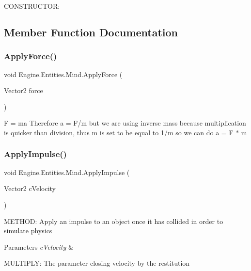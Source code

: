 C\+O\+N\+S\+T\+R\+U\+C\+T\+OR\+: 



\subsection{Member Function Documentation}
\mbox{\label{a00318_a4a05ceb8a5b1eb7f04e3111dd165b4b5}} 
\subsubsection{\texorpdfstring{Apply\+Force()}{ApplyForce()}}
{\footnotesize\ttfamily void Engine.\+Entities.\+Mind.\+Apply\+Force (\begin{DoxyParamCaption}\item[{Vector2}]{force }\end{DoxyParamCaption})\hspace{0.3cm}{\ttfamily [inline]}}

F = ma Therefore a = F/m but we are using inverse mass because multiplication is quicker than division, thus m is set to be equal to 1/m so we can do a = F $\ast$ m \mbox{\label{a00318_a378218df0a8c27a981e98167197d9c16}} 
\subsubsection{\texorpdfstring{Apply\+Impulse()}{ApplyImpulse()}}
{\footnotesize\ttfamily void Engine.\+Entities.\+Mind.\+Apply\+Impulse (\begin{DoxyParamCaption}\item[{Vector2}]{c\+Velocity }\end{DoxyParamCaption})\hspace{0.3cm}{\ttfamily [inline]}}



M\+E\+T\+H\+OD\+: Apply an impulse to an object once it has collided in order to simulate physics 


\begin{DoxyParams}{Parameters}
{\em c\+Velocity} & \\
\hline
\end{DoxyParams}
M\+U\+L\+T\+I\+P\+LY\+: The parameter closing velocity by the restitution

